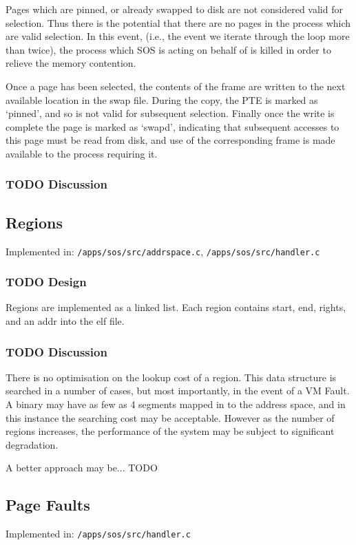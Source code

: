 \documentclass[a4paper,12pt]{article}
\begin{document}
Pages which are pinned, or already swapped to disk are not considered valid
for selection.  Thus there is the potential that there are no pages in the
process which are valid selection.  In this event, (i.e., the event we iterate
through the loop more than twice), the process which SOS is acting on behalf
of is killed in order to relieve the memory contention.

Once a page has been selected, the contents of the frame are written to the
next available location in the swap file.  During the copy, the PTE is marked
as `pinned', and so is not valid for subsequent selection.  Finally once the
write is complete the page is marked as `swapd', indicating that subsequent
accesses to this page must be read from disk, and use of the corresponding
frame is made available to the process requiring it.

\subsubsection{TODO Discussion}

\subsection{Regions}
Implemented in: \texttt{/apps/sos/src/addrspace.c}, \texttt{/apps/sos/src/handler.c}

\subsubsection{TODO Design}
Regions are implemented as a linked list.  Each region contains start, end,
rights, and an addr into the elf file.
\subsubsection{TODO Discussion}
There is no optimisation on the lookup cost of a region.  This data structure
is searched in a number of cases, but most importantly, in the event of a VM
Fault.  A binary may have as few as 4 segments mapped in to the address space,
and in this instance the searching cost may be acceptable.  However as the
number of regions increases, the performance of the system may be subject to
significant degradation.

A better approach may be... TODO

\subsection{Page Faults}
Implemented in: \texttt{/apps/sos/src/handler.c}
\end{document}
